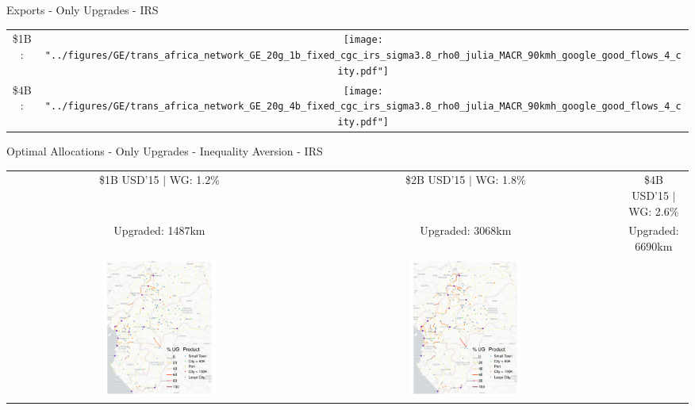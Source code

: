 \documentclass[aspectratio=169,xcolor=dvipsnames]{beamer}
\begin{document}
\begin{frame}[label=EXPOU_IRS]{Exports - Only Upgrades - IRS \quad \hyperlink{IOU_IRS}{}}
\begin{tabular}{cc} 
\$1B: & \texttt{[image: "../figures/GE/trans\_africa\_network\_GE\_20g\_1b\_fixed\_cgc\_irs\_sigma3.8\_rho0\_julia\_MACR\_90kmh\_google\_good\_flows\_4\_city.pdf"]} \\
\$4B: & \texttt{[image: "../figures/GE/trans\_africa\_network\_GE\_20g\_4b\_fixed\_cgc\_irs\_sigma3.8\_rho0\_julia\_MACR\_90kmh\_google\_good\_flows\_4\_city.pdf"]}  
\end{tabular}
\end{frame}

\begin{frame}[label=IOU_IRS_IA]{Optimal Allocations - Only Upgrades - Inequality Aversion - IRS \quad \hyperlink{IOU_IA}{}}
\vspace{-1mm}
\begin{adjustbox}{center}
\begin{tabular}{@{}c@{}|@{}c@{}|@{}c@{}} 
\$1B USD'15 $|$ WG: 1.2\% & \$2B USD'15 $|$ WG: 1.8\% & \$4B USD'15 $|$ WG: 2.6\%  \\
Upgraded: 1487km & Upgraded: 3068km & Upgraded: 6690km \\ 
\includegraphics[width=0.38\textwidth, trim= {0.9cm 0 0.9cm 0}, clip]{"../figures/GE/trans_africa_network_GE_20g_1b_fixed_cgc_irs_sigma3.8_rho2_julia_MACR_90kmh_google_perc_ug.pdf"} & 
\includegraphics[width=0.38\textwidth, trim= {0.9cm 0 0.9cm 0}, clip]{"../figures/GE/trans_africa_network_GE_20g_2b_fixed_cgc_irs_sigma3.8_rho2_julia_MACR_90kmh_google_perc_ug.pdf"} &

\end{tabular}
\end{adjustbox}
\end{frame}
\end{document}
